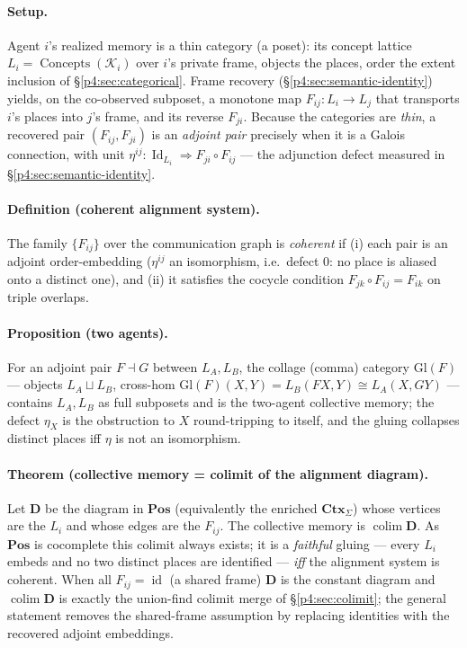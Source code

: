\documentclass{article}
\begin{document}
\paragraph{Setup.} Agent $i$'s realized memory is a thin category (a poset):
its concept lattice $L_i=\operatorname{Concepts}(\mathcal{K}_i)$ over $i$'s
private frame, objects the places, order the extent inclusion of
\S\ref{p4:sec:categorical}. Frame recovery (\S\ref{p4:sec:semantic-identity}) yields,
on the co-observed subposet, a monotone map $F_{ij}:L_i\to L_j$ that transports
$i$'s places into $j$'s frame, and its reverse $F_{ji}$. Because the categories
are \emph{thin}, a recovered pair $(F_{ij},F_{ji})$ is an \emph{adjoint pair}
precisely when it is a Galois connection, with unit
$\eta^{ij}:\operatorname{Id}_{L_i}\Rightarrow F_{ji}\!\circ\!F_{ij}$ --- the
adjunction defect measured in \S\ref{p4:sec:semantic-identity}.

\paragraph{Definition (coherent alignment system).} The family $\{F_{ij}\}$
over the communication graph is \emph{coherent} if (i) each pair is an adjoint
order-embedding ($\eta^{ij}$ an isomorphism, i.e.\ defect $0$: no place is
aliased onto a distinct one), and (ii) it satisfies the cocycle condition
$F_{jk}\!\circ\!F_{ij}=F_{ik}$ on triple overlaps.

\paragraph{Proposition (two agents).} For an adjoint pair $F\dashv G$ between
$L_A,L_B$, the collage (comma) category $\mathrm{Gl}(F)$ --- objects
$L_A\sqcup L_B$, cross-hom $\mathrm{Gl}(F)(X,Y)=L_B(FX,Y)\cong L_A(X,GY)$
\citep{maclane1998categories} --- contains $L_A,L_B$ as full subposets and is
the two-agent collective memory; the defect $\eta_X$ is the obstruction to $X$
round-tripping to itself, and the gluing collapses distinct places iff $\eta$
is not an isomorphism.

\paragraph{Theorem (collective memory = colimit of the alignment diagram).}
Let $\mathbf{D}$ be the diagram in $\mathbf{Pos}$ (equivalently the enriched
$\mathbf{Ctx}_\Sigma$) whose vertices are the $L_i$ and whose edges are the
$F_{ij}$. The collective memory is $\operatorname{colim}\mathbf{D}$. As
$\mathbf{Pos}$ is cocomplete this colimit always exists; it is a \emph{faithful}
gluing --- every $L_i$ embeds and no two distinct places are identified ---
\emph{iff} the alignment system is coherent. When all $F_{ij}=\operatorname{id}$
(a shared frame) $\mathbf{D}$ is the constant diagram and
$\operatorname{colim}\mathbf{D}$ is exactly the union-find colimit merge of
\S\ref{p4:sec:colimit}; the general statement removes the shared-frame assumption
by replacing identities with the recovered adjoint embeddings.
\end{document}
